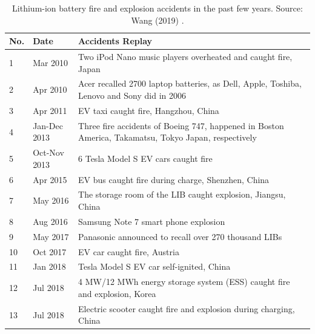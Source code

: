 \begin{table}[ht]
    \centering
    \begin{footnotesize}
        \begin{tabular}{|p{7mm} p{22mm} p{113mm}|}
            \hline
            \rowcolor{bluepoli!40}
            \textbf{No.} & \textbf{Date} & \textbf{Accidents Replay}\T\B \\
            \hline \hline

            1 & Mar 2010 & Two iPod Nano music players overheated and caught fire, Japan\T\B\\

            2 & Apr 2010 & Acer recalled 2700 laptop batteries, as Dell, Apple, Toshiba, Lenovo and Sony did in 2006\T\B\\

            3 & Apr 2011 & EV taxi caught fire, Hangzhou, China\T\B\\

            4 & Jan-Dec 2013 & Three fire accidents of Boeing 747, happened in Boston America, Takamatsu, Tokyo Japan, respectively\T\B\\

            5 & Oct-Nov 2013 & 6 Tesla Model S EV cars caught fire\T\B\\

            6 & Apr 2015 & EV bus caught fire during charge, Shenzhen, China\T\B\\

            7 & May 2016 & The storage room of the LIB caught explosion, Jiangsu, China\T\B\\

            8 & Aug 2016 & Samsung Note 7 smart phone explosion\T\B\\

            9 & May 2017 & Panasonic announced to recall over 270 thousand LIBs\T\B\\

            10 & Oct 2017 & EV car caught fire, Austria\T\B\\

            11 & Jan 2018 & Tesla Model S EV car self-ignited, China\T\B\\

            12 & Jul 2018 & 4 MW/12 MWh energy storage system (ESS) caught fire and explosion, Korea\T\B\\

            13 & Jul 2018 & Electric scooter caught fire and explosion during charging, China\T\B\\
            \hline
        \end{tabular}
        \\[10pt]
        \caption[Lithium-ion battery accidents]{Lithium-ion battery fire and explosion accidents in the past few years. Source: Wang (2019) \cite{wang2019review}.}
        \label{table:accidents}
    \end{footnotesize}
\end{table}


